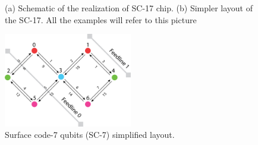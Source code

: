 \begin{figure}[h!]
\centerline{
}
\caption{(a) Schematic of the realization of SC-17 chip. (b) Simpler layout of the SC-17. All the examples will refer to this picture}
\label{Surafce17b}
\end{figure}



\begin{figure}[h!]
\centering
\includegraphics[width=0.5\textwidth]{figures/sc7_w_cnnct.png}
\caption{\label{fig:org08ec89a}
Surface code-7 qubits (SC-7) simplified layout.}
\end{figure}



